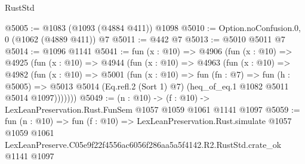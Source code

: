 \begin{lexlean}{RustStd}
\begin{coremodule}
@5005 := @1083 (@1093 (@4884 @411)) @1098
@5010 := Option.noConfusion.{0, 0} (@1062 (@4889 @411)) @7
@5011 := @442 @7
@5013 := @5010 @5011 @7
@5014 := @1096 @1141
@5041 := fun (x : @10) =>
  @4906
    (fun (x : @10) =>
    @4925
      (fun (x : @10) =>
      @4944
        (fun (x : @10) =>
        @4963
          (fun (x : @10) =>
          @4982
            (fun (x : @10) =>
            @5001
              (fun (x : @10) =>
              fun (fn : @7) =>
              fun (h : @5005) =>
              @5013 @5014 (Eq.refl.{2} (Sort 1) @7) (heq_of_eq.{1} @1082 @5011 @5014 @1097)))))))
@5049 := (n : @10) -> (f : @10) -> LexLeanPreservation.Rust.FunSem @1057 @1059 @1061 @1141 @1097
@5059 := fun (n : @10) =>
  fun (f : @10) =>
  LexLeanPreservation.Rust.simulate
    @1057
    @1059
    @1061
    LexLeanPreserve.C05e9f22f4556ac6056f286aa5a5f4142.R2.RustStd.crate_ok
    @1141
    @1097
\end{coremodule}
\end{lexlean}
